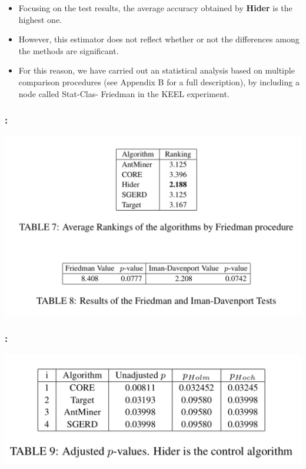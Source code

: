 \documentclass{beamer}
\begin{document}
\begin{CJK*}{UTF8}{bsmi}
\begin{frame}
	
	\begin{itemize}
		\item Focusing on the test results, the average accuracy obtained by \textbf{Hider} is the highest one.
		\item However, this estimator does not reflect whether or not the differences among the methods are significant. 
		\item For this reason, we have carried out an statistical analysis based on multiple comparison procedures (see Appendix B for a full description), by including a node called Stat-Clas- Friedman in the KEEL experiment.
	\end{itemize}
	
	
\end{frame}

\begin{frame}
	\frametitle{\insertsection : \insertsubsection}
	
	\begin{center}
		\includegraphics[width=1\linewidth]{./12.png}
	\end{center}
\end{frame}


\begin{frame}
	\frametitle{\insertsection : \insertsubsection}
	
	\begin{center}
		\includegraphics[width=1\linewidth]{./13.png}
	\end{center}
\end{frame}


\end{CJK*}
\end{document}
